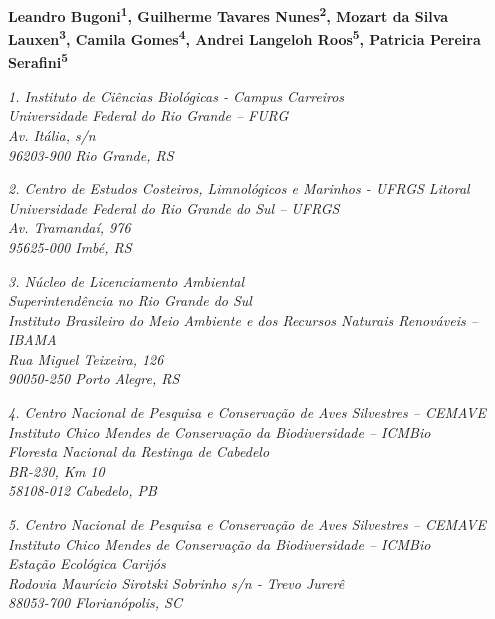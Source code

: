 \documentclass[
  oneside]{scrbook}
\begin{document}

\pagestyle{headings}

\textbf{Leandro Bugoni\textsuperscript{1}, Guilherme Tavares Nunes\textsuperscript{2}, Mozart da Silva Lauxen\textsuperscript{3}, Camila Gomes\textsuperscript{4}, Andrei Langeloh Roos\textsuperscript{5}, Patricia Pereira Serafini\textsuperscript{5}}

\emph{1. Instituto de Ciências Biológicas - Campus Carreiros}\\
\emph{Universidade Federal do Rio Grande -- FURG}\\
\emph{Av. Itália, s/n}\\
\emph{96203-900 Rio Grande, RS}

\emph{2. Centro de Estudos Costeiros, Limnológicos e Marinhos - UFRGS Litoral}\\
\emph{Universidade Federal do Rio Grande do Sul -- UFRGS}\\
\emph{Av. Tramandaí, 976}\\
\emph{95625-000 Imbé, RS}

\emph{3. Núcleo de Licenciamento Ambiental}\\
\emph{Superintendência no Rio Grande do Sul}\\
\emph{Instituto Brasileiro do Meio Ambiente e dos Recursos Naturais Renováveis -- IBAMA}\\
\emph{Rua Miguel Teixeira, 126}\\
\emph{90050-250 Porto Alegre, RS}

\emph{4. Centro Nacional de Pesquisa e Conservação de Aves Silvestres -- CEMAVE}\\
\emph{Instituto Chico Mendes de Conservação da Biodiversidade -- ICMBio}\\
\emph{Floresta Nacional da Restinga de Cabedelo}\\
\emph{BR-230, Km 10}\\
\emph{58108-012 Cabedelo, PB}

\emph{5. Centro Nacional de Pesquisa e Conservação de Aves Silvestres -- CEMAVE}\\
\emph{Instituto Chico Mendes de Conservação da Biodiversidade -- ICMBio}\\
\emph{Estação Ecológica Carijós}\\
\emph{Rodovia Maurício Sirotski Sobrinho s/n - Trevo Jurerê}\\
\emph{88053-700 Florianópolis, SC}
\end{document}
